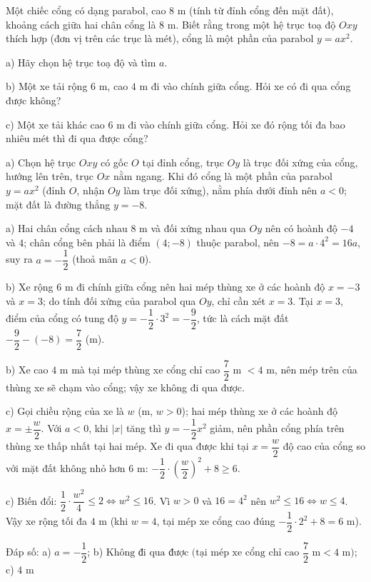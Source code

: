\begin{problem}[9DS-HSB2-019]
Một chiếc cổng có dạng parabol, cao $8$ m (tính từ đỉnh cổng đến mặt đất), khoảng cách giữa hai chân cổng là $8$ m. Biết rằng trong một hệ trục toạ độ $Oxy$ thích hợp (đơn vị trên các trục là mét), cổng là một phần của parabol $y = ax^2$.

a) Hãy chọn hệ trục toạ độ và tìm $a$.

b) Một xe tải rộng $6$ m, cao $4$ m đi vào chính giữa cổng. Hỏi xe có đi qua cổng được không?

c) Một xe tải khác cao $6$ m đi vào chính giữa cổng. Hỏi xe đó rộng tối đa bao nhiêu mét thì đi qua được cổng?

\begin{solution}
a) Chọn hệ trục $Oxy$ có gốc $O$ tại đỉnh cổng, trục $Oy$ là trục đối xứng của cổng, hướng lên trên, trục $Ox$ nằm ngang. Khi đó cổng là một phần của parabol $y = ax^2$ (đỉnh $O$, nhận $Oy$ làm trục đối xứng), nằm phía dưới đỉnh nên $a < 0$; mặt đất là đường thẳng $y = -8$.

a) Hai chân cổng cách nhau $8$ m và đối xứng nhau qua $Oy$ nên có hoành độ $-4$ và $4$; chân cổng bên phải là điểm $(4; -8)$ thuộc parabol, nên $-8 = a \cdot 4^2 = 16a$, suy ra $a = -\dfrac{1}{2}$ (thoả mãn $a < 0$).

b) Xe rộng $6$ m đi chính giữa cổng nên hai mép thùng xe ở các hoành độ $x = -3$ và $x = 3$; do tính đối xứng của parabol qua $Oy$, chỉ cần xét $x = 3$. Tại $x = 3$, điểm của cổng có tung độ $y = -\dfrac{1}{2} \cdot 3^2 = -\dfrac{9}{2}$, tức là cách mặt đất $-\dfrac{9}{2} - (-8) = \dfrac{7}{2}$ (m).

b) Xe cao $4$ m mà tại mép thùng xe cổng chỉ cao $\dfrac{7}{2}$ m $< 4$ m, nên mép trên của thùng xe sẽ chạm vào cổng; vậy xe không đi qua được.

c) Gọi chiều rộng của xe là $w$ (m, $w > 0$); hai mép thùng xe ở các hoành độ $x = \pm\dfrac{w}{2}$. Với $a < 0$, khi $|x|$ tăng thì $y = -\dfrac{1}{2}x^2$ giảm, nên phần cổng phía trên thùng xe thấp nhất tại hai mép. Xe đi qua được khi tại $x = \dfrac{w}{2}$ độ cao của cổng so với mặt đất không nhỏ hơn $6$ m: $-\dfrac{1}{2} \cdot \left(\dfrac{w}{2}\right)^2 + 8 \geq 6$.

c) Biến đổi: $\dfrac{1}{2} \cdot \dfrac{w^2}{4} \leq 2 \Leftrightarrow w^2 \leq 16$. Vì $w > 0$ và $16 = 4^2$ nên $w^2 \leq 16 \Leftrightarrow w \leq 4$. Vậy xe rộng tối đa $4$ m (khi $w = 4$, tại mép xe cổng cao đúng $-\dfrac{1}{2} \cdot 2^2 + 8 = 6$ m).

Đáp số: a) $\boxed{a = -\dfrac{1}{2}}$; b) $\boxed{\text{Không đi qua được (tại mép xe cổng chỉ cao } \dfrac{7}{2} \text{ m} < 4 \text{ m)}}$; c) $\boxed{4 \text{ m}}$
\end{solution}
\end{problem}

